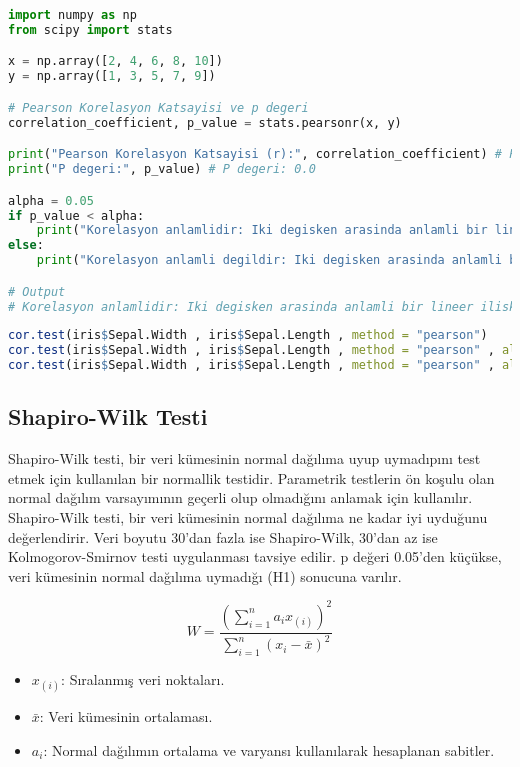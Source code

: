 \begin{lstlisting}[language=Python]
import numpy as np
from scipy import stats

x = np.array([2, 4, 6, 8, 10])
y = np.array([1, 3, 5, 7, 9])

# Pearson Korelasyon Katsayisi ve p degeri
correlation_coefficient, p_value = stats.pearsonr(x, y)

print("Pearson Korelasyon Katsayisi (r):", correlation_coefficient) # Pearson Korelasyon Katsayisi (r): 1.0
print("P degeri:", p_value) # P degeri: 0.0

alpha = 0.05
if p_value < alpha:
    print("Korelasyon anlamlidir: Iki degisken arasinda anlamli bir lineer iliski vardir.")
else:
    print("Korelasyon anlamli degildir: Iki degisken arasinda anlamli bir lineer iliski yoktur.")

# Output
# Korelasyon anlamlidir: Iki degisken arasinda anlamli bir lineer iliski vardir.
\end{lstlisting}

\begin{lstlisting}[language=R]
cor.test(iris$Sepal.Width , iris$Sepal.Length , method = "pearson")
cor.test(iris$Sepal.Width , iris$Sepal.Length , method = "pearson" , alternative = "less")
cor.test(iris$Sepal.Width , iris$Sepal.Length , method = "pearson" , alternative = "greater")
\end{lstlisting}

\newpage

\subsection{Shapiro-Wilk Testi}
Shapiro-Wilk testi, bir veri kümesinin normal dağılıma uyup uymadıpını test etmek için kullanılan bir normallik testidir. Parametrik testlerin ön koşulu olan normal dağılım varsayımının geçerli olup olmadığını anlamak için kullanılır. Shapiro-Wilk testi, bir veri kümesinin normal dağılıma ne kadar iyi uyduğunu değerlendirir. Veri boyutu 30'dan fazla ise Shapiro-Wilk, 30'dan az ise Kolmogorov-Smirnov testi uygulanması tavsiye edilir. p değeri 0.05'den küçükse, veri kümesinin normal dağılıma uymadığı (H1) sonucuna varılır.

\[
W = \frac{\left( \sum_{i=1}^{n} a_i x_{(i)} \right)^2}{\sum_{i=1}^{n} (x_i - \bar{x})^2}
\]

\begin{itemize}
	\item $x_(i)$: Sıralanmış veri noktaları.
	\item $\bar{x}$: Veri kümesinin ortalaması.
	\item $a_i$: Normal dağılımın ortalama ve varyansı kullanılarak hesaplanan sabitler.
\end{itemize}

